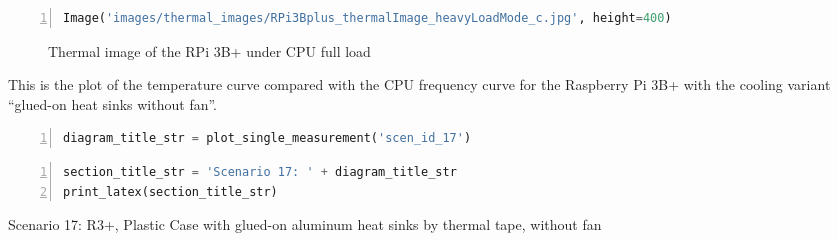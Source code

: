 \documentclass[10pt,parskip=half,
toc=sectionentrywithdots,
bibliography=totocnumbered,
captions=tableheading,numbers=noendperiod]{scrartcl}
\begin{document}
\begin{lstlisting}[language=Python,numbers=left,xleftmargin=20pt,xrightmargin=5pt,belowskip=5pt,aboveskip=5pt]
Image('images/thermal_images/RPi3Bplus_thermalImage_heavyLoadMode_c.jpg', height=400)
\end{lstlisting}

    \begin{figure}[h!]\begin{center}\end{center}\caption{Thermal image of the RPi 3B+ under CPU full load}\label{fig:thermo_rpi3b+_stress}\end{figure}

This is the plot of the temperature curve compared with the CPU
frequency curve for the Raspberry Pi 3B+ with the cooling variant
``glued-on heat sinks without fan''.

\begin{lstlisting}[language=Python,numbers=left,xleftmargin=20pt,xrightmargin=5pt,belowskip=5pt,aboveskip=5pt]
diagram_title_str = plot_single_measurement('scen_id_17')
\end{lstlisting}

\begin{figure}[H]\begin{center}\end{center}\end{figure}

\begin{lstlisting}[language=Python,numbers=left,xleftmargin=20pt,xrightmargin=5pt,belowskip=5pt,aboveskip=5pt]
section_title_str = 'Scenario 17: ' + diagram_title_str
print_latex(section_title_str)
\end{lstlisting}

\begin{table}[H]
\centering
\begin{adjustbox}{max width=\textwidth}
Scenario 17: R3+, Plastic Case with glued-on aluminum heat sinks by thermal tape, without fan
\end{adjustbox}
\end{table}

\begin{lstlisting}[language=Python,numbers=left,xleftmargin=20pt,xrightmargin=5pt,belowskip=5pt,aboveskip=5pt]

\end{lstlisting}



\end{document}
